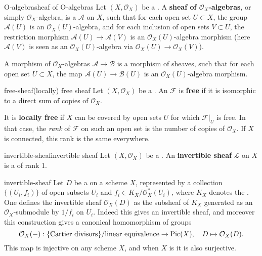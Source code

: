 \begin{topic}{O-algebra}{sheaf of O-algebras}
    Let $(X, \mathcal{O}_X)$ be a . A \textbf{sheaf of $\mathcal{O}_X$-algebras}, or simply $\mathcal{O}_X$-algebra, is a  $\mathcal{A}$ on $X$, such that for each open set $U \subset X$, the group $\mathcal{A}(U)$ is an $\mathcal{O}_X(U)$-algebra, and for each inclusion of open sets $V \subset U$, the restriction morphism $\mathcal{A}(U) \to \mathcal{A}(V)$ is an $\mathcal{O}_X(U)$-algebra morphism (here $\mathcal{A}(V)$ is seen as an $\mathcal{O}_X(U)$-algebra via $\mathcal{O}_X(U) \to \mathcal{O}_X(V)$).
    
    A morphism of $\mathcal{O}_X$-algebras $\mathcal{A} \to \mathcal{B}$ is a morphism of sheaves, such that for each open set $U \subset X$, the map $\mathcal{A}(U) \to \mathcal{B}(U)$ is an $\mathcal{O}_X(U)$-algebra morphism.
\end{topic}

\begin{topic}{free-sheaf}{(locally) free sheaf}
    Let $(X, \mathcal{O}_X)$ be a . An  $\mathcal{F}$ is \textbf{free} if it is isomorphic to a direct sum of copies of $\mathcal{O}_X$.
    
    It is \textbf{locally free} if $X$ can be covered by open sets $U$ for which $\mathcal{F}|_U$ is free. In that case, the \textit{rank} of $\mathcal{F}$ on such an open set is the number of copies of $\mathcal{O}_X$. If $X$ is connected, this rank is the same everywhere.
\end{topic}

\begin{topic}{invertible-sheaf}{invertible sheaf}
    Let $(X, \mathcal{O}_X)$ be a . An \textbf{invertible sheaf} $\mathcal{L}$ on $X$ is a   of rank 1.
\end{topic}

\begin{example}{invertible-sheaf}
    Let $D$ be a  on a scheme $X$, represented by a collection $\{ (U_i, f_i) \}$ of open subsets $U_i$ and $f_i \in K_X / \mathcal{O}_X^* (U_i)$, where $K_X$ denotes the . One defines the invertible sheaf $\mathcal{O}_X(D)$ as the subsheaf of $K_X$ generated as an $\mathcal{O}_X$-submodule by $1/f_i$ on $U_i$. Indeed this gives an invertible sheaf, and moreover this construction gives a canonical homomorphism of groups
    \[ \mathcal{O}_X(-) : \{ \textup{Cartier divisors} \} / \textup{linear equivalence} \to \textup{Pic}(X), \quad D \mapsto \mathcal{O}_X(D) . \]
    This map is injective on any scheme $X$, and when $X$ is  it is also surjective.
\end{example}

